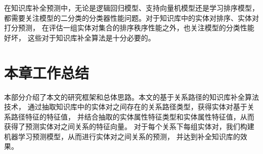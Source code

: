 在知识库补全预测中，无论是逻辑回归模型、支持向量机模型还是学习排序模型，
都需要关注模型的二分类的分类器性能问题。对于知识库中的实体对排序、实体对打分预测，
在评估一组实体对集合的排序秩序性能之外，也关注模型的分类性能好坏，
这些对于知识库补全算法是十分必要的。


\section{本章工作总结}
本部分介绍了本文的研究框架和总体思路。本文的基于关系路径的知识库补全算法技术，
通过抽取知识库中的实体对之间存在的关系路径类型，获得实体对基于关系路径特征的特征值，
并结合抽取的实体属性特征类型和实体属性特征值，从而获得了预测实体对之间关系的特征向量。
对于每个关系下每组实体对，我们构建机器学习预测模型，从而进行实体对之间关系的预测，
并达到补全知识库的效果。


